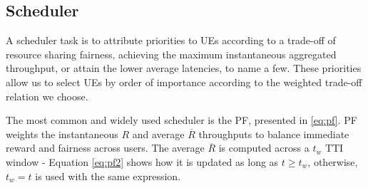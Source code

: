 \begin{comment}
    \multicolumn{1}{|c|}{7}  & \multicolumn{1}{c|}{6} & \multicolumn{1}{c|}{466} & 458.72  & 458.72   & 917.44   & 1834.88  & 3669.75  \\ \hline
    \multicolumn{1}{|c|}{8}  & \multicolumn{1}{c|}{6} & \multicolumn{1}{c|}{567} & 558.14  & 558.14   & 1116.28  & 2232.56  & 4465.13  \\ \hline
    \multicolumn{1}{|c|}{9}  & \multicolumn{1}{c|}{6} & \multicolumn{1}{c|}{666} & 655.59  & 655.59   & 1311.19  & 2622.38  & 5244.75  \\ \hline
    \multicolumn{1}{|c|}{10} & \multicolumn{1}{c|}{6} & \multicolumn{1}{c|}{772} & 759.94  & 759.94   & 1519.88  & 3039.75  & 6079.50  \\ \hline
    \multicolumn{1}{|c|}{11} & \multicolumn{1}{c|}{6} & \multicolumn{1}{c|}{873} & 859.36  & 859.36   & 1718.72  & 3437.44  & 6874.88  \\ \hline
    \multicolumn{1}{|c|}{12} & \multicolumn{1}{c|}{8} & \multicolumn{1}{c|}{711} & 933.19  & 933.19   & 1866.38  & 3732.75  & 7465.50  \\ \hline
    \multicolumn{1}{|c|}{13} & \multicolumn{1}{c|}{8} & \multicolumn{1}{c|}{797} & 1046.06 & 1046.06  & 2092.13  & 4184.25  & 8368.50  \\ \hline
    \multicolumn{1}{|c|}{14} & \multicolumn{1}{c|}{8} & \multicolumn{1}{c|}{885} & 1161.56 & 1161.56  & 2323.13  & 4646.25  & 9292.50  \\ \hline
    \multicolumn{1}{|c|}{15} & \multicolumn{1}{c|}{8} & \multicolumn{1}{c|}{948} & 1244.25 & 1244.25  & 2488.50  & 4977.00  & 9954.00  \\ \hline
    \end{tabular}
\end{table}
\end{comment}





\subsection*{Scheduler} \label{sec:scheduler}
A scheduler task is to attribute priorities to UEs according to a trade-off of resource sharing fairness, achieving the maximum instantaneous aggregated throughput, or attain the lower average latencies, to name a few. These priorities allow us to select UEs by order of importance according to the weighted trade-off relation we choose. 

The most common and widely used scheduler is the \ac{PF}, presented in \eqref{eq:pf}. \ac{PF} weights the instantaneous $R$ and average $\overline{R}$ throughputs to balance immediate reward and fairness across users. The average $\overline{R}$ is computed across a $t_w$ TTI window - Equation \eqref{eq:pf2} shows how it is updated as long as $t \geq t_w$, otherwise, $t_w = t$ is used with the same expression.

